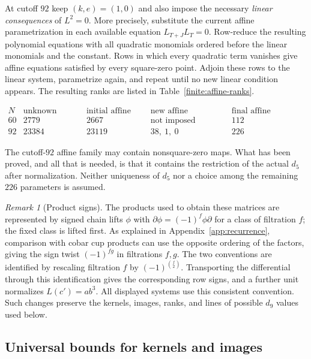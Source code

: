 \documentclass[11pt]{article}
\theoremstyle{definition}
\theoremstyle{remark}
\newtheorem{remark}[theorem]{Remark}
\numberwithin{equation}{section}
\begin{document}
At cutoff $92$ keep $(k,e)=(1,0)$ and also impose the necessary
\emph{linear consequences} of $L^2=0$.  More precisely, substitute
the current affine parametrization in each available equation
$L_{T+J}L_T=0$.  Row-reduce the resulting polynomial equations with
all quadratic monomials ordered before the linear monomials and
the constant.  Rows in which every quadratic term vanishes give
affine equations satisfied by every square-zero point.  Adjoin
these rows to the linear system, parametrize again, and repeat until
no new linear condition appears.  The resulting ranks are listed in
Table~\ref{finite:affine-ranks}.

\begin{table}[htbp]
\small
\(
\begin{array}{c|r|r|c|r}
 N&\text{unknown entries}&\text{initial affine rank}&
     \text{new affine constraints}&
     \text{final affine dimension}\\\hline
 60&2779&2667&\text{not imposed}&112\\
 92&23384&23119&38,\ 1,\ 0&226
\end{array}
\)
\caption{Necessary affine conditions on the normalized fifth differential.}
\label{finite:affine-ranks}
\end{table}

The cutoff-$92$ affine family may contain nonsquare-zero maps.  What
has been proved, and all that is needed, is that it contains the
restriction of the actual $d_5$ after normalization.  Neither
uniqueness of $d_5$ nor a choice among the remaining $226$ parameters
is assumed.

\begin{remark}[Product signs]\label{finite:signs}
The products used to obtain these matrices are represented by signed
chain lifts $\phi$ with
$\partial\phi=(-1)^f\phi\partial$ for a class of filtration $f$;
the fixed class is lifted first.  As explained in
Appendix~\ref{app:recurrence}, comparison with cobar cup products
can use the opposite ordering of the factors, giving the sign twist
$(-1)^{fg}$ in filtrations $f,g$.  The two conventions are identified by
rescaling filtration $f$ by $(-1)^{\binom f2}$.  Transporting the
differential through this identification gives the corresponding
row signs, and a further unit normalizes $L(c')=ab^3$.  All displayed
systems use this consistent convention.  Such changes preserve the
kernels, images, ranks, and lines of possible $d_9$ values used
below.
\end{remark}

\subsection{Universal bounds for kernels and images}
\end{document}
